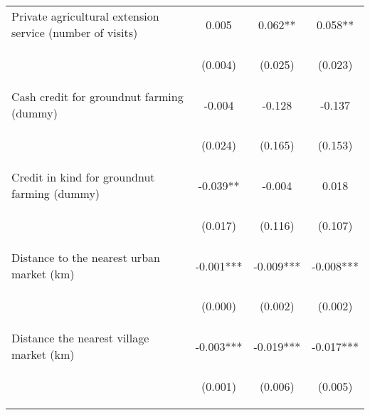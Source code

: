 \begin{center}
\begin{tabular}{lccc}
Private agricultural extension service (number of visits) & 0.005 & 0.062** & 0.058** \\
\vspace{4pt} & \begin{footnotesize}(0.004)\end{footnotesize} & \begin{footnotesize}(0.025)\end{footnotesize} & \begin{footnotesize}(0.023)\end{footnotesize} \\
Cash credit for groundnut farming (dummy) & -0.004 & -0.128 & -0.137 \\
\vspace{4pt} & \begin{footnotesize}(0.024)\end{footnotesize} & \begin{footnotesize}(0.165)\end{footnotesize} & \begin{footnotesize}(0.153)\end{footnotesize} \\
Credit in kind for groundnut farming (dummy) & -0.039** & -0.004 & 0.018 \\
\vspace{4pt} & \begin{footnotesize}(0.017)\end{footnotesize} & \begin{footnotesize}(0.116)\end{footnotesize} & \begin{footnotesize}(0.107)\end{footnotesize} \\
Distance to the nearest urban market (km) & -0.001*** & -0.009*** & -0.008*** \\
\vspace{4pt} & \begin{footnotesize}(0.000)\end{footnotesize} & \begin{footnotesize}(0.002)\end{footnotesize} & \begin{footnotesize}(0.002)\end{footnotesize} \\
Distance the nearest village market (km) & -0.003*** & -0.019*** & -0.017*** \\
\vspace{4pt} & \begin{footnotesize}(0.001)\end{footnotesize} & \begin{footnotesize}(0.006)\end{footnotesize} & \begin{footnotesize}(0.005)\end{footnotesize} \\

\end{tabular}
\end{center}
